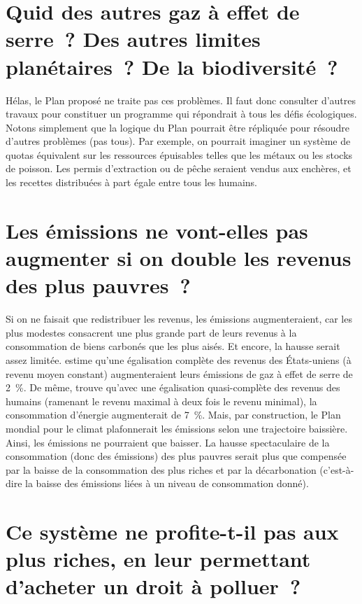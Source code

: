\documentclass[a5paper,french]{memoir}
\begin{document}
\section*{\normalsize Quid des autres gaz à effet de serre~? Des autres limites planétaires~? De la biodiversité~?}\label{q:scope}

Hélas, le Plan proposé ne traite pas ces problèmes. Il faut donc consulter d'autres travaux pour constituer un programme qui répondrait à tous les défis écologiques. %
Notons simplement que la logique du Plan pourrait être répliquée pour résoudre d'autres problèmes (pas tous). Par exemple, on pourrait imaginer un système de quotas équivalent sur les ressources épuisables telles que les métaux ou les stocks de poisson. Les permis d'extraction %
ou de pêche seraient vendus aux enchères, et les recettes distribuées à part égale entre tous les humains.

\section*{\normalsize Les émissions ne vont-elles pas augmenter si on double les revenus des plus pauvres~?}\label{q:emissions}

Si on ne faisait que redistribuer les revenus, les émissions augmenteraient, car les plus modestes consacrent une plus grande part de leurs revenus à la consommation de biens carbonés que les plus aisés. Et encore, la hausse serait assez limitée. \cite{sager_income_2019} estime qu'une égalisation complète des revenus des États-uniens (à revenu moyen constant) augmenteraient leurs émissions de gaz à effet de serre de 2~\%. De même, \cite{oswald_global_2021} trouve qu'avec une égalisation quasi-complète des revenus des humains (ramenant le revenu maximal à deux fois le revenu minimal), la consommation d'énergie augmenterait de 7~\%. 
Mais, par construction, le Plan mondial pour le climat plafonnerait les émissions selon une trajectoire baissière. Ainsi, les émissions ne pourraient que baisser. La hausse spectaculaire de la consommation (donc des émissions) des plus pauvres serait plus que compensée par la baisse de la consommation des plus riches et par la décarbonation (c'est-à-dire la baisse des émissions liées à un niveau de consommation donné).

\section*{\normalsize Ce système ne profite-t-il pas aux plus riches, en leur permettant d'acheter un droit à polluer~?}\label{q:riches}
\end{document}
